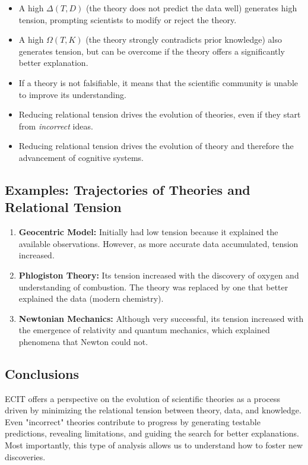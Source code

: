\documentclass{article}
\begin{document}
\begin{itemize}
\item A high \(\Delta(T, D)\) (the theory does not predict the data well) generates high tension, prompting scientists to modify or reject the theory.
\item A high \(\Omega(T, K)\) (the theory strongly contradicts prior knowledge) also generates tension, but can be overcome if the theory offers a significantly better explanation.
\item If a theory is not falsifiable, it means that the scientific community is unable to improve its understanding.
\item Reducing relational tension drives the evolution of theories, even if they start from \textit{incorrect} ideas.
\item Reducing relational tension drives the evolution of theory and therefore the advancement of cognitive systems.
\end{itemize}

\subsection{Examples: Trajectories of Theories and Relational Tension}

\begin{enumerate}
\item \textbf{Geocentric Model:} Initially had low tension because it explained the available observations. However, as more accurate data accumulated, tension increased.
\item \textbf{Phlogiston Theory:} Its tension increased with the discovery of oxygen and understanding of combustion. The theory was replaced by one that better explained the data (modern chemistry).
\item \textbf{Newtonian Mechanics:} Although very successful, its tension increased with the emergence of relativity and quantum mechanics, which explained phenomena that Newton could not.
\end{enumerate}

\subsection{Conclusions}

ECIT offers a perspective on the evolution of scientific theories as a process driven by minimizing the relational tension between theory, data, and knowledge. Even "incorrect" theories contribute to progress by generating testable predictions, revealing limitations, and guiding the search for better explanations. Most importantly, this type of analysis allows us to understand how to foster new discoveries.
\end{document}
